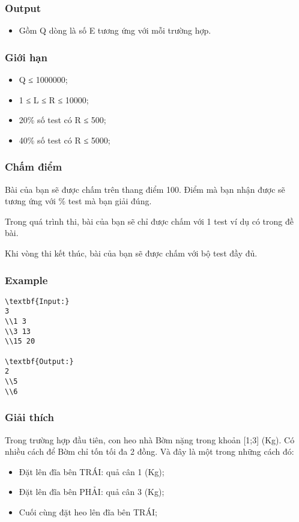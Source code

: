 \subsubsection{   Output  }
\begin{itemize}
	\item     Gồm Q dòng là số E tương ứng với mỗi trường hợp.   
\end{itemize}

\subsubsection{   Giới hạn  }
\begin{itemize}
	\item     Q ≤ 1000000;   
	\item     1 ≤ L ≤ R ≤ 10000;   
	\item     20\% số test có R ≤ 500;   
	\item     40\% số test có R ≤ 5000;   
\end{itemize}

\subsubsection{   Chấm điểm  }

   Bài của bạn sẽ được chấm trên thang điểm 100. Điểm mà bạn nhận được sẽ tương ứng với \% test mà bạn giải đúng.  

   Trong quá trình thi, bài của bạn sẽ chỉ được chấm với 1 test ví dụ có trong đề bài.  

   Khi vòng thi kết thúc, bài của bạn sẽ được chấm với bộ test đầy đủ.  

\subsubsection{   Example  }
\begin{verbatim}
\textbf{Input:}
3
\\1 3
\\3 13
\\15 20

\textbf{Output:}
2
\\5
\\6\end{verbatim}

\subsubsection{   Giải thích  }

   Trong trường hợp đầu tiên, con heo nhà Bờm nặng trong khoản [1;3] (Kg). Có nhiều cách để Bờm chỉ tốn tối đa 2 đồng. Và đây là một trong những cách đó:  
\begin{itemize}
	\item     Đặt lên đĩa bên TRÁI: quả cân 1 (Kg);   
	\item     Đặt lên đĩa bên PHẢI: quả cân 3 (Kg);   
	\item     Cuối cùng đặt heo lên đĩa bên TRÁI;   
\end{itemize}

